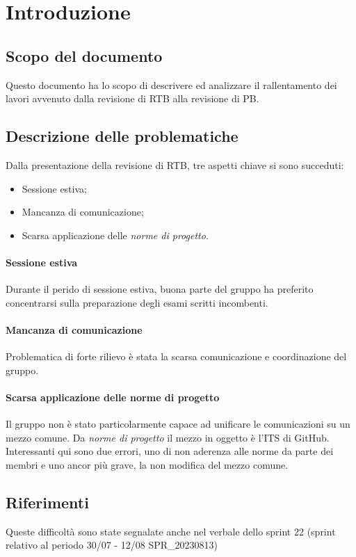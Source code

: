 
\section{Introduzione}
\subsection{Scopo del documento}

Questo documento ha lo scopo di descrivere ed analizzare il rallentamento dei lavori avvenuto dalla revisione di RTB
alla revisione di PB.

\subsection{Descrizione delle problematiche}

Dalla presentazione della revisione di RTB, tre aspetti chiave si sono succeduti:

\begin{itemize}
    \item Sessione estiva;
    \item Mancanza di comunicazione;
    \item Scarsa applicazione delle \textit{norme di progetto}.
\end{itemize}

\paragraph{Sessione estiva}
Durante il perido di sessione estiva, buona parte del gruppo ha preferito concentrarsi sulla preparazione degli esami scritti incombenti.

\paragraph{Mancanza di comunicazione}
Problematica di forte rilievo è stata la scarsa comunicazione e coordinazione del gruppo. 

\paragraph{Scarsa applicazione delle norme di progetto}

Il gruppo non è stato particolarmente capace ad unificare le comunicazioni su un mezzo comune. Da \textit{norme di progetto} il mezzo in oggetto è l'ITS di GitHub. Interessanti qui sono due errori, uno di non aderenza alle norme da parte dei membri e uno ancor più grave, la non modifica del mezzo comune.

\subsection{Riferimenti}

Queste difficoltà sono state segnalate anche nel verbale dello sprint 22 (sprint relativo al periodo 30/07 - 12/08 SPR\_20230813)
